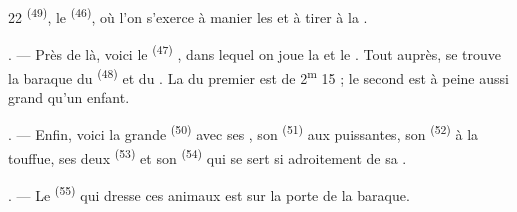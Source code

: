 \begin{VUpage}[24]{22}
\VUcontinue
{} \textsuperscript{(49)}, le  \textsuperscript{(46)}, où l'on s'exerce à manier les\nl
{} et à tirer à la .

. --- Près de là, voici le  \textsuperscript{(47)} ,\nl
dans lequel on joue la  et le . Tout\nl
auprès, se trouve la baraque du  \textsuperscript{(48)} et du\nl
{}. La  du premier est de 2\textsuperscript{m} 15 ; le second\nl
est à peine aussi grand qu'un enfant.

. --- Enfin, voici la grande  \textsuperscript{(50)} avec\nl
ses , son  \textsuperscript{(51)} aux \nl
puissantes, son  \textsuperscript{(52)} à la  touffue, ses\nl
deux  \textsuperscript{(53)} et son  \textsuperscript{(54)} qui se sert\nl
si adroitement de sa .

. --- Le  \textsuperscript{(55)} qui dresse ces animaux\nl
est sur la porte de la baraque.

\VUsaut{6.0mm}
\VUfilet{22mm}
\end{VUpage}
